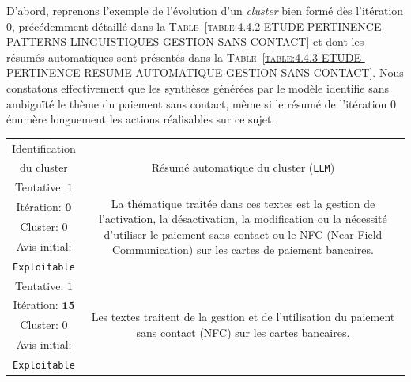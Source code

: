 			D'abord, reprenons l'exemple de l'évolution d'un \textit{cluster} bien formé dès l'itération $0$, précédemment détaillé dans la \textsc{Table~\ref{table:4.4.2-ETUDE-PERTINENCE-PATTERNS-LINGUISTIQUES-GESTION-SANS-CONTACT}} et dont les résumés automatiques sont présentés dans la \textsc{Table~\ref{table:4.4.3-ETUDE-PERTINENCE-RESUME-AUTOMATIQUE-GESTION-SANS-CONTACT}}.
			Nous constatons effectivement que les synthèses générées par le modèle identifie sans ambiguïté le thème du paiement sans contact, même si le résumé de l'itération $0$ énumère longuement les actions réalisables sur ce sujet.
			\begin{table}[!htb]
				\begin{center}
				\def\arraystretch{0.8}  %
				\begin{tabular}{|c|c|}
				
					\hline
					\rowcolor{colorTableHeader!15}
					Identification
						&
						\tabularnewline
					\rowcolor{colorTableHeader!15}
					du cluster
						& \multirow{-2}{*}{
							Résumé automatique du cluster (\texttt{LLM})
						}
						\tabularnewline
						\hline \hline
					
					{ \footnotesize Tentative: $1$ }
						& \multirow{5}{*}{\parbox{12cm}{
							\footnotesize La thématique traitée dans ces textes est la gestion de l'activation, la désactivation, la modification ou la nécessité d'utiliser le paiement sans contact ou le NFC (Near Field Communication) sur les cartes de paiement bancaires.
						}}
						\tabularnewline
					{ \footnotesize Itération: $\textbf{0}$ }
						&
						\tabularnewline
					{ \footnotesize Cluster: $0$ }
						&
						\tabularnewline
					{ \footnotesize Avis initial: }
						&
						\tabularnewline
					{ \footnotesize \color{colorDarkPastelGreen} \texttt{Exploitable} }
						&
						\tabularnewline
						\hline
						
					{ \footnotesize Tentative: $1$ }
						& \multirow{5}{*}{\parbox{12cm}{
							\footnotesize Les textes traitent de la gestion et de l'utilisation du paiement sans contact (NFC) sur les cartes bancaires.
						}}
						\tabularnewline
					{ \footnotesize Itération: $\textbf{15}$ }
						&
						\tabularnewline
					{ \footnotesize Cluster: $0$ }
						& 
						\tabularnewline
					{ \footnotesize Avis initial: }
						&
						\tabularnewline
					{ \footnotesize \color{colorDarkPastelGreen} \texttt{Exploitable} }
						&
						\tabularnewline
						\hline
					

\end{tabular}
\end{center}
\end{table}
